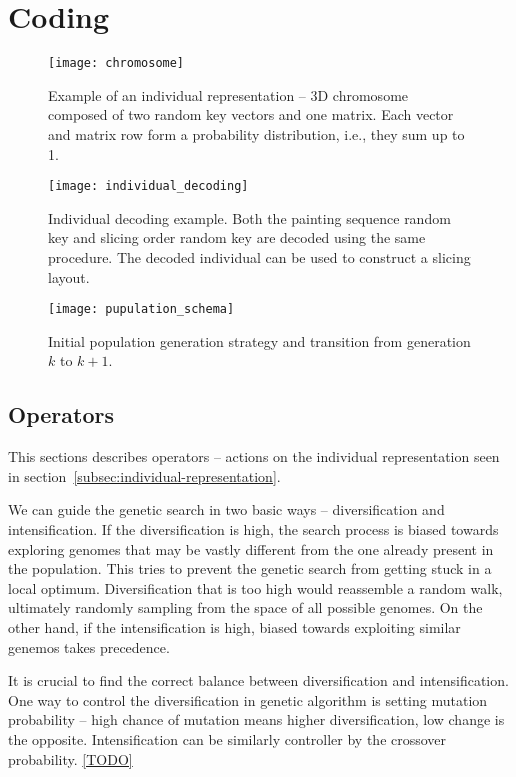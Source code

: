 \chapter{Coding}\label{ch:coding}


\begin{figure}[htp]
    \texttt{[image: chromosome]}\label{fig:chromosome}
    \caption{
        Example of an individual representation – 3D chromosome composed of two random key vectors and one matrix.
        Each vector and matrix row form a probability distribution, i.e., they sum up to 1.
    }
\end{figure}

\begin{figure}[htp]
    \texttt{[image: individual\_decoding]}
    \caption{
        Individual decoding example. Both the painting sequence random key and slicing order random key
        are decoded using the same procedure. The decoded individual can be used to construct a slicing layout.
    }
    \label{fig:individual-decoding}
\end{figure}

\begin{figure}[htp]
    \texttt{[image: pupulation\_schema]}\label{fig:population-schema}
    \caption{Initial population generation strategy and transition from generation $k$ to $k+1$.}
\end{figure}


\section{Operators}\label{sec:operators}
This sections describes operators – actions on the individual representation
seen in section~\ref{subsec:individual-representation}.

We can guide the genetic search in two basic ways – diversification and intensification.
If the diversification is high, the search process is biased towards exploring genomes
that may be vastly different from the one already present in the population.
This tries to prevent the genetic search from getting stuck in a local optimum.
Diversification that is too high would reassemble a random walk, ultimately randomly sampling
from the space of all possible genomes. On the other hand, if the intensification is high,
biased towards exploiting similar genemos takes precedence.

It is crucial to find the correct balance between diversification and intensification.
One way to control the diversification in genetic algorithm is setting
mutation probability – high chance of mutation means higher diversification, low change is the opposite.
Intensification can be similarly controller by the crossover probability.
\ref{TODO}

